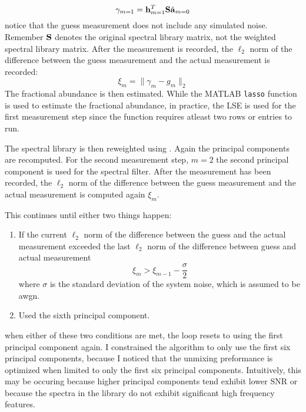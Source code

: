 \begin{equation}
	\gamma_{m=1} = \displaystyle \mathbf{h}_{m=1}^{T} \displaystyle \mathbf{S} \hat{ \displaystyle \mathbf{a} }_{m=0}
\end{equation}
%
notice that the guess measurement does not include any simulated noise. Remember $\displaystyle \mathbf{S}$ denotes the original spectral library matrix, not the weighted spectral library matrix. After the measurement is recorded, the $\ell_2$ norm of the difference between the guess measurement and the actual measurement is recorded:
%
\begin{equation}
	\xi_m = \| \gamma_m - g_m \|_2 
\end{equation}
%
The fractional abundance is then estimated. While the MATLAB \texttt{lasso} function is used to estimate the fractional abundance, in practice, the LSE is used for the first measurement step since the function requires atleast two rows or entries to run. 

The spectral library is then reweighted using . Again the principal components are recomputed. For the second measurement step, $m=2$ the second principal component is used for the spectral filter. After the measurement has been recorded, the  $\ell_2$ norm of the difference between the guess measurement and the actual measurement is computed again $\xi_m$. 


This continues until either two things happen: 
\begin{enumerate}
	\item If the current $\ell_2$ norm of the difference between the guess and the actual measurement exceeded the last $\ell_2$ norm of the difference between guess and actual measurement
	\begin{equation}
		\xi_m > \xi_{m-1} - \frac{\sigma}{2}
	\end{equation}	
	where $\sigma$ is the standard deviation of the system noise, which is assumed to be \gls{awgn}.

	\item Used the sixth principal component.
\end{enumerate}

when either of these two conditions are met, the loop resets to using the first principal component again. I constrained the algorithm to only use the first six principal components, because I noticed that the unmixing preformance is optimized when limited to only the first six principal components. Intuitively, this may be occuring because higher principal components tend exhibit lower SNR or because the spectra in the library do not exhibit significant high frequency features. 

